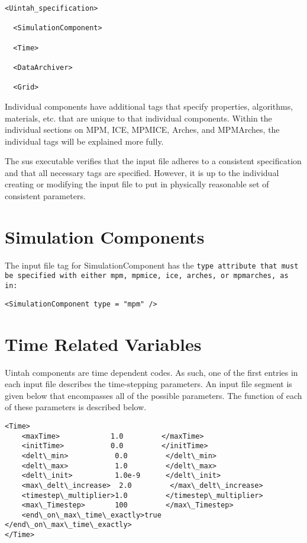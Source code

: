 \begin{Verbatim}[fontsize=\footnotesize]
  <Uintah_specification>

  <SimulationComponent>

  <Time>

  <DataArchiver>

  <Grid>
\end{Verbatim}


Individual components have additional tags that specify properties,
algorithms, materials, etc. that are unique to that individual
components.  Within the individual sections on MPM, ICE, MPMICE,
Arches, and MPMArches, the individual tags will be explained more
fully.

The sus executable verifies that the input file adheres to a consistent
specification and that all necessary tags are specified.  However, it
is up to the individual creating or modifying the input file to put in
physically reasonable set of consistent parameters.


\section{Simulation Components} \label{Sec:SimulationComponent}

The input file tag for SimulationComponent has the \tt type \normalfont
attribute that must be specified with either \tt mpm, mpmice, ice, arches,
\normalfont or \tt mpmarches, \normalfont as in:

\begin{Verbatim}[fontsize=\footnotesize]
<SimulationComponent type = "mpm" />
\end{Verbatim}



\section{Time Related Variables} \label{Sec:TimeRelatedVariables}
Uintah components are time dependent codes.  As such, one of the first
entries in each input file describes the time-stepping parameters.  An
input file segment is given below that encompasses all of the possible
parameters.  The function of each of these parameters is described below.

\begin{Verbatim}[fontsize=\footnotesize]
<Time>
    <maxTime>            1.0         </maxTime>
    <initTime>           0.0         </initTime>
    <delt\_min>           0.0         </delt\_min>
    <delt\_max>           1.0         </delt\_max>
    <delt\_init>          1.0e-9      </delt\_init>
    <max\_delt\_increase>  2.0         </max\_delt\_increase>
    <timestep\_multiplier>1.0         </timestep\_multiplier>
    <max\_Timestep>       100         </max\_Timestep>
    <end\_on\_max\_time\_exactly>true    </end\_on\_max\_time\_exactly>
</Time>
\end{Verbatim}

